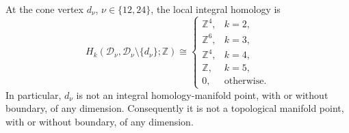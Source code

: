 \begin{proposition}
At the cone vertex \(d_\nu\), \(\nu\in\{12,24\}\), the local integral
homology is
\begin{equation}
 H_k(\mathcal D_\nu,
       \mathcal D_\nu\setminus\{d_\nu\};\mathbb Z)
 \cong
 \begin{cases}
  \mathbb Z^4,&k=2,\\
  \mathbb Z^6,&k=3,\\
  \mathbb Z^4,&k=4,\\
  \mathbb Z,&k=5,\\
  0,&\text{otherwise}.
 \end{cases}
 \label{wb:cusp-cone-carrier-local-homology}
\end{equation}
In particular, \(d_\nu\) is not an integral homology-manifold point, with or
without boundary, of any dimension.  Consequently it is not a topological
manifold point, with or without boundary, of any dimension.
\end{proposition}



